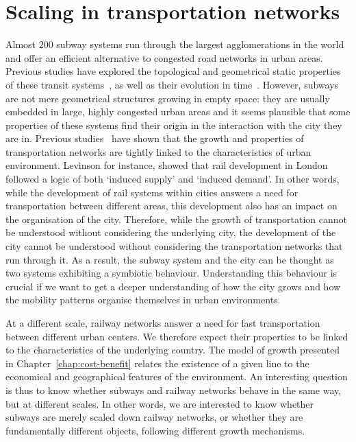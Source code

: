\chapter{Scaling in transportation networks}
\label{chap:scaling_networks}

Almost $200$ subway systems run through the largest agglomerations in the world
and offer an efficient alternative to congested road networks in urban areas.
Previous studies have explored the topological and geometrical static properties
of these transit systems~\cite{Derrible:2009,Levinson:2012}, as well as their
evolution in time~\cite{Roth:2012}. However, subways are not mere geometrical
structures growing in empty space: they are usually embedded in large, highly
congested urban areas and it seems plausible that some properties of these
systems find their origin in the interaction with the city they are in. Previous
studies~\cite{Levinson:2008,Xie:2009} have shown that the growth and properties
of transportation networks are tightly linked to the characteristics of urban
environment. Levinson \cite{Levinson:2008} for instance, showed that rail
development in London followed a logic of both `induced supply' and `induced
demand'. In other words, while the development of rail systems within cities
answers a need for transportation between different areas, this development also
has an impact on the organisation of the city. Therefore, while the growth of
transportation cannot be understood without considering the underlying city, the
development of the city cannot be understood without considering the
transportation networks that run through it. As a result, the subway system and
the city can be thought as two systems exhibiting a symbiotic behaviour.
Understanding this behaviour is crucial if we want to get a deeper understanding
of how the city grows and how the mobility patterns organise themselves in urban
environments.

At a different scale, railway networks answer a need for fast transportation
between different urban centers. We therefore expect their properties to be
linked to the characteristics of the underlying country. The model of growth
presented in Chapter~\ref{chap:cost-benefit} relates the existence of a given
line to the economical and geographical features of the environment. An
interesting question is thus to know whether subways and railway networks behave
in the same way, but at different scales. In other words, we are interested to
know whether subways are merely scaled down railway networks, or whether they
are fundamentally different objects, following different growth mechanisms. 

